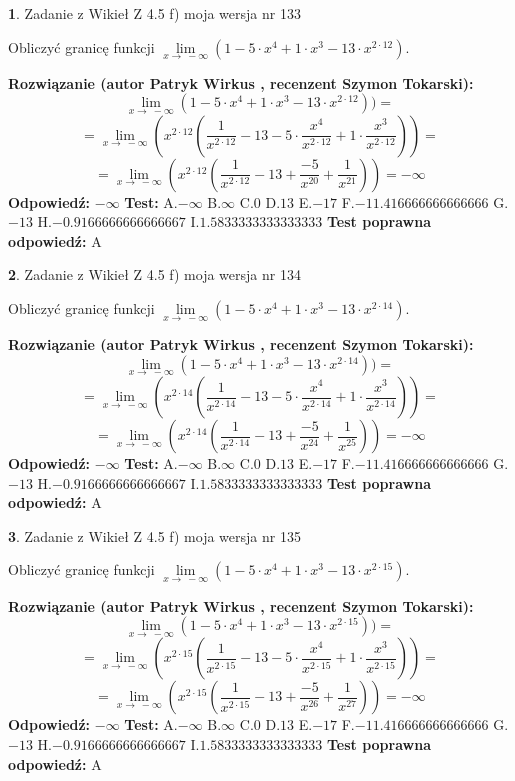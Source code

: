 \documentclass[12pt, a4paper]{article}
\theoremstyle{definition} %
\newtheorem{zad}{}
\newcommand{\zadStart}[1]{\begin{zad}#1\newline}
\newcommand{\zadStop}{\end{zad}}
\newcommand{\rozwStart}[2]{\noindent \textbf{Rozwiązanie (autor #1 , recenzent #2): }\newline}
\newcommand{\rozwStop}{\newline}
\newcommand{\odpStart}{\noindent \textbf{Odpowiedź:}\newline}
\newcommand{\odpStop}{\newline}
\newcommand{\testStart}{\noindent \textbf{Test:}\newline}
\newcommand{\testStop}{\newline}
\newcommand{\kluczStart}{\noindent \textbf{Test poprawna odpowiedź:}\newline}
\newcommand{\kluczStop}{\newline}
\begin{document}
\zadStart{Zadanie z Wikieł Z 4.5 f) moja wersja nr 133}


Obliczyć granicę funkcji  $\lim\limits_{x\to\ -\infty}(1 - 5 \cdot x^{4}+1 \cdot x^{3}- 13 \cdot x^{2\cdot12})$.
\zadStop
\rozwStart{Patryk Wirkus}{Szymon Tokarski}
$$\lim\limits_{x\to\ -\infty}(1 - 5 \cdot x^{4}+1 \cdot x^{3}- 13 \cdot x^{2\cdot12}))=$$
$$=\lim\limits_{x\to\ -\infty}(x^{2\cdot12}(\frac{1}{x^{2\cdot12}}-13 -5 \cdot \frac{x^{4}}{x^{2\cdot12}}+1 \cdot \frac{x^{3}}{x^{2\cdot12}}))=$$
$$=\lim\limits_{x\to\ -\infty}(x^{2\cdot12}(\frac{1}{x^{2\cdot12}}-13 + \frac{-5}{x^{20}}+ \frac{1}{x^{21}}))=-\infty$$
\rozwStop
\odpStart
$-\infty$
\odpStop
\testStart
A.$-\infty$ B.$\infty$ C.$0$ D.$13$ E.$-17$
F.$-11.416666666666666$ G.$-13$
H.$-0.9166666666666667$
I.$1.5833333333333333$
\testStop
\kluczStart
A
\kluczStop



\zadStart{Zadanie z Wikieł Z 4.5 f) moja wersja nr 134}


Obliczyć granicę funkcji  $\lim\limits_{x\to\ -\infty}(1 - 5 \cdot x^{4}+1 \cdot x^{3}- 13 \cdot x^{2\cdot14})$.
\zadStop
\rozwStart{Patryk Wirkus}{Szymon Tokarski}
$$\lim\limits_{x\to\ -\infty}(1 - 5 \cdot x^{4}+1 \cdot x^{3}- 13 \cdot x^{2\cdot14}))=$$
$$=\lim\limits_{x\to\ -\infty}(x^{2\cdot14}(\frac{1}{x^{2\cdot14}}-13 -5 \cdot \frac{x^{4}}{x^{2\cdot14}}+1 \cdot \frac{x^{3}}{x^{2\cdot14}}))=$$
$$=\lim\limits_{x\to\ -\infty}(x^{2\cdot14}(\frac{1}{x^{2\cdot14}}-13 + \frac{-5}{x^{24}}+ \frac{1}{x^{25}}))=-\infty$$
\rozwStop
\odpStart
$-\infty$
\odpStop
\testStart
A.$-\infty$ B.$\infty$ C.$0$ D.$13$ E.$-17$
F.$-11.416666666666666$ G.$-13$
H.$-0.9166666666666667$
I.$1.5833333333333333$
\testStop
\kluczStart
A
\kluczStop



\zadStart{Zadanie z Wikieł Z 4.5 f) moja wersja nr 135}


Obliczyć granicę funkcji  $\lim\limits_{x\to\ -\infty}(1 - 5 \cdot x^{4}+1 \cdot x^{3}- 13 \cdot x^{2\cdot15})$.
\zadStop
\rozwStart{Patryk Wirkus}{Szymon Tokarski}
$$\lim\limits_{x\to\ -\infty}(1 - 5 \cdot x^{4}+1 \cdot x^{3}- 13 \cdot x^{2\cdot15}))=$$
$$=\lim\limits_{x\to\ -\infty}(x^{2\cdot15}(\frac{1}{x^{2\cdot15}}-13 -5 \cdot \frac{x^{4}}{x^{2\cdot15}}+1 \cdot \frac{x^{3}}{x^{2\cdot15}}))=$$
$$=\lim\limits_{x\to\ -\infty}(x^{2\cdot15}(\frac{1}{x^{2\cdot15}}-13 + \frac{-5}{x^{26}}+ \frac{1}{x^{27}}))=-\infty$$
\rozwStop
\odpStart
$-\infty$
\odpStop
\testStart
A.$-\infty$ B.$\infty$ C.$0$ D.$13$ E.$-17$
F.$-11.416666666666666$ G.$-13$
H.$-0.9166666666666667$
I.$1.5833333333333333$
\testStop
\kluczStart
A
\kluczStop
\end{document}
